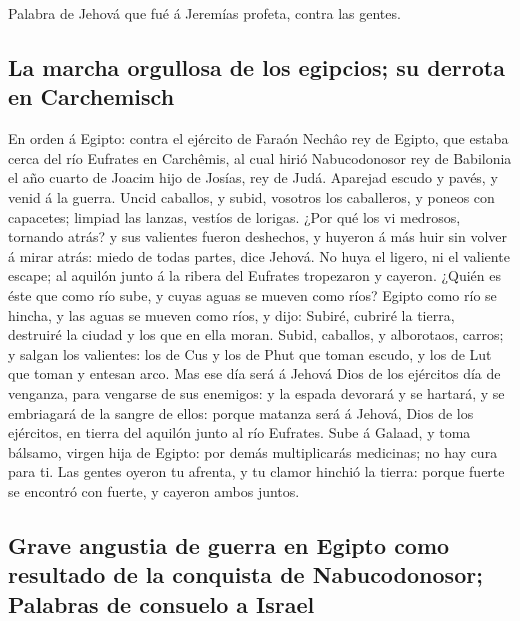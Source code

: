  Palabra de Jehová que fué á Jeremías profeta, contra las
gentes.

\hypertarget{la-marcha-orgullosa-de-los-egipcios-su-derrota-en-carchemisch}{%
\subsection{La marcha orgullosa de los egipcios; su derrota en
Carchemisch}\label{la-marcha-orgullosa-de-los-egipcios-su-derrota-en-carchemisch}}

 En orden á Egipto: contra el ejército de Faraón Nechâo
rey de Egipto, que estaba cerca del río Eufrates en Carchêmis, al cual
hirió Nabucodonosor rey de Babilonia el año cuarto de Joacim hijo de
Josías, rey de Judá.  Aparejad escudo y pavés, y venid á
la guerra.  Uncid caballos, y subid, vosotros los
caballeros, y poneos con capacetes; limpiad las lanzas, vestíos de
lorigas.  ¿Por qué los vi medrosos, tornando atrás? y sus
valientes fueron deshechos, y huyeron á más huir sin volver á mirar
atrás: miedo de todas partes, dice Jehová.  No huya el
ligero, ni el valiente escape; al aquilón junto á la ribera del Eufrates
tropezaron y cayeron.  ¿Quién es éste que como río sube, y
cuyas aguas se mueven como ríos?  Egipto como río se
hincha, y las aguas se mueven como ríos, y dijo: Subiré, cubriré la
tierra, destruiré la ciudad y los que en ella moran. 
Subid, caballos, y alborotaos, carros; y salgan los valientes: los de
Cus y los de Phut que toman escudo, y los de Lut que toman y entesan
arco.  Mas ese día será á Jehová Dios de los ejércitos
día de venganza, para vengarse de sus enemigos: y la espada devorará y
se hartará, y se embriagará de la sangre de ellos: porque matanza será á
Jehová, Dios de los ejércitos, en tierra del aquilón junto al río
Eufrates.  Sube á Galaad, y toma bálsamo, virgen hija de
Egipto: por demás multiplicarás medicinas; no hay cura para ti.
 Las gentes oyeron tu afrenta, y tu clamor hinchió la
tierra: porque fuerte se encontró con fuerte, y cayeron ambos juntos.

\hypertarget{grave-angustia-de-guerra-en-egipto-como-resultado-de-la-conquista-de-nabucodonosor-palabras-de-consuelo-a-israel}{%
\subsection{Grave angustia de guerra en Egipto como resultado de la
conquista de Nabucodonosor; Palabras de consuelo a
Israel}\label{grave-angustia-de-guerra-en-egipto-como-resultado-de-la-conquista-de-nabucodonosor-palabras-de-consuelo-a-israel}}

